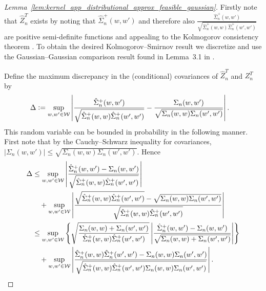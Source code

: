 \begin{proof}[%
  Lemma~\ref{lem:kernel_app_distributional_approx_feasible_gaussian}]

  Firstly note that $\hat Z_n^T$ exists
  by noting that $\hat \Sigma_n^+(w,w')$ and therefore also
  $\frac{\hat \Sigma_n^+(w,w')}
  {\sqrt{\hat \Sigma_n^+(w,w) \hat \Sigma_n^+(w',w')}}$
  are positive semi-definite
  functions and appealing to the
  Kolmogorov consistency theorem \citep{gine2021mathematical}.
  To obtain the desired Kolmogorov--Smirnov result we discretize and
  use the Gaussian--Gaussian comparison result found in
  Lemma~3.1 in \citet{chernozhukov2013gaussian}.


  Define the maximum discrepancy in the (conditional) covariances
  of $\hat Z_n^T$ and $Z_n^T$ by
  \begin{align*}
    \Delta
    &\vcentcolon=
    \sup_{w, w' \in \mathcal{W}}
    \left|
    \frac{\hat \Sigma_n^+(w,w')}
    {\sqrt{\hat \Sigma_n^+(w,w) \hat \Sigma_n^+(w',w')}}
    - \frac{\Sigma_n(w,w')}
    {\sqrt{\Sigma_n(w,w) \Sigma_n(w',w')}}
    \right|.
  \end{align*}
  This random variable can be bounded in probability
  in the following manner.
  First note that by the Cauchy--Schwarz inequality
  for covariances,
  $|\Sigma_n(w,w')| \leq
  \sqrt{\Sigma_n(w,w) \Sigma_n(w',w')}$.
  Hence
  \begin{align*}
    \Delta
    &\leq
    \sup_{w, w' \in \mathcal{W}}
    \left|
    \frac{\hat \Sigma_n^+(w,w') - \Sigma_n(w,w')}
    {\sqrt{\hat \Sigma_n^+(w,w) \hat \Sigma_n^+(w',w')}}
    \right| \\
    &\quad+
    \sup_{w, w' \in \mathcal{W}}
    \left|
    \frac{\sqrt{\hat \Sigma_n^+(w,w) \hat \Sigma_n^+(w',w')}
    - \sqrt{\Sigma_n(w,w) \Sigma_n(w',w')}}
    {\sqrt{\hat \Sigma_n^+(w,w) \hat \Sigma_n^+(w',w')}}
    \right| \\
    &\leq
    \sup_{w, w' \in \mathcal{W}}
    \left\{
      \sqrt{\frac{\Sigma_n(w,w) + \Sigma_n(w',w')}
      {\hat \Sigma_n^+(w,w) \hat \Sigma_n^+(w',w')}}
      \left|
      \frac{\hat \Sigma_n^+(w,w') - \Sigma_n(w,w')}
      {\sqrt{\Sigma_n(w,w) + \Sigma_n(w',w')}}
      \right|
    \right\} \\
    &\quad+
    \sup_{w, w' \in \mathcal{W}}
    \left|
    \frac{\hat \Sigma_n^+(w,w)\hat \Sigma_n^+(w',w')
    - \Sigma_n(w,w) \Sigma_n(w',w')}
    {\sqrt{\hat \Sigma_n^+(w,w) \hat \Sigma_n^+(w',w')
    \Sigma_n(w,w) \Sigma_n(w',w')}}
    \right|.
  \end{align*}

\end{proof}
